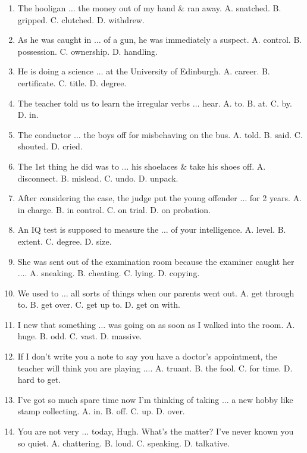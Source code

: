 \documentclass{article}
\numberwithin{equation}{section}
\begin{document}
\begin{enumerate}[leftmargin=2mm]
	\item The hooligan $\ldots$ the money out of my hand \& ran away. {\sf A.} snatched. {\sf B.} gripped. {\sf C.} clutched. {\sf D.} withdrew.
	\item As he was caught in $\ldots$ of a gun, he was immediately a suspect. {\sf A.} control. {\sf B.} possession. {\sf C.} ownership. {\sf D.} handling.
	\item He is doing a science $\ldots$ at the University of Edinburgh. {\sf A.} career. {\sf B.} certificate. {\sf C.} title. {\sf D.} degree.
	\item The teacher told us to learn the irregular verbs $\ldots$ hear. {\sf A.} to. {\sf B.} at. {\sf C.} by. {\sf D.} in.
	\item The conductor $\ldots$ the boys off for misbehaving on the bus. {\sf A.} told. {\sf B.} said. {\sf C.} shouted. {\sf D.} cried.
	\item The 1st thing he did was to $\ldots$ his shoelaces \& take his shoes off. {\sf A.} disconnect. {\sf B.} mislead. {\sf C.} undo. {\sf D.} unpack.
	\item After considering the case, the judge put the young offender $\ldots$ for 2 years. {\sf A.} in charge. {\sf B.} in control. {\sf C.} on trial. {\sf D.} on probation.
	\item An IQ test is supposed to measure the $\ldots$ of your intelligence. {\sf A.} level. {\sf B.} extent. {\sf C.} degree. {\sf D.} size.
	\item She was sent out of the examination room because the examiner caught her $\ldots$. {\sf A.} sneaking. {\sf B.} cheating. {\sf C.} lying. {\sf D.} copying.
	\item We used to $\ldots$ all sorts of things when our parents went out. {\sf A.} get through to. {\sf B.} get over. {\sf C.} get up to. {\sf D.} get on with.
	\item I new that something $\ldots$ was going on as soon as I walked into the room. {\sf A.} huge. {\sf B.} odd. {\sf C.} vast. {\sf D.} massive.
	\item If I don't write you a note to say you have a doctor's appointment, the teacher will think you are playing $\ldots$. {\sf A.} truant. {\sf B.} the fool. {\sf C.} for time. {\sf D.} hard to get.
	\item I've got so much spare time now I'm thinking of taking $\ldots$ a new hobby like stamp collecting. {\sf A.} in. {\sf B.} off. {\sf C.} up. {\sf D.} over.
	\item You are not very $\ldots$ today, Hugh. What's the matter? I've never known you so quiet. {\sf A.} chattering. {\sf B.} loud. {\sf C.} speaking. {\sf D.} talkative.

\end{enumerate}
\end{document}
